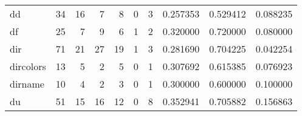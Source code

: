 \begin{longtable}{lrrrrrrrrr}
dd        &                                      34 &                                                 16 &                                                  7 &                                                  8 &                                                  0 &                                                  3 &                                           0.257353 &                               0.529412 &                             0.088235 \\
df        &                                      25 &                                                  7 &                                                  9 &                                                  6 &                                                  1 &                                                  2 &                                           0.320000 &                               0.720000 &                             0.080000 \\
dir       &                                      71 &                                                 21 &                                                 27 &                                                 19 &                                                  1 &                                                  3 &                                           0.281690 &                               0.704225 &                             0.042254 \\
dircolors &                                      13 &                                                  5 &                                                  2 &                                                  5 &                                                  0 &                                                  1 &                                           0.307692 &                               0.615385 &                             0.076923 \\
dirname   &                                      10 &                                                  4 &                                                  2 &                                                  3 &                                                  0 &                                                  1 &                                           0.300000 &                               0.600000 &                             0.100000 \\
du        &                                      51 &                                                 15 &                                                 16 &                                                 12 &                                                  0 &                                                  8 &                                           0.352941 &                               0.705882 &                             0.156863 \\

\end{longtable}
